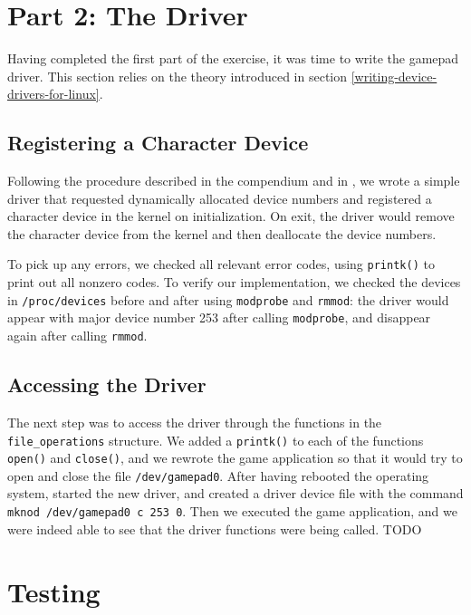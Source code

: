 \section{Part 2: The Driver}
Having completed the first part of the exercise, it was time to write the gamepad driver. This section relies on the theory introduced in section \ref{writing-device-drivers-for-linux}.

\subsection{Registering a Character Device}
Following the procedure described in the compendium and in \cite{linux-device-drivers}, we wrote a simple driver that requested dynamically allocated device numbers and registered a character device in the kernel on initialization. On exit, the driver would remove the character device from the kernel and then deallocate the device numbers.

To pick up any errors, we checked all relevant error codes, using \texttt{printk()} to print out all nonzero codes. To verify our implementation, we checked the devices in \texttt{/proc/devices} before and after using \texttt{modprobe} and \texttt{rmmod}: the driver would appear with major device number 253 after calling \texttt{modprobe}, and disappear again after calling \texttt{rmmod}.

\subsection{Accessing the Driver}
The next step was to access the driver through the functions in the \texttt{file\_operations} structure. We added a \texttt{printk()} to each of the functions \texttt{open()} and \texttt{close()}, and we rewrote the game application so that it would try to open and close the file \texttt{/dev/gamepad0}. After having rebooted the operating system, started the new driver, and created a driver device file with the command \texttt{mknod /dev/gamepad0 c 253 0}. Then we executed the game application, and we were indeed able to see that the driver functions were being called.
TODO %


\section{Testing}
